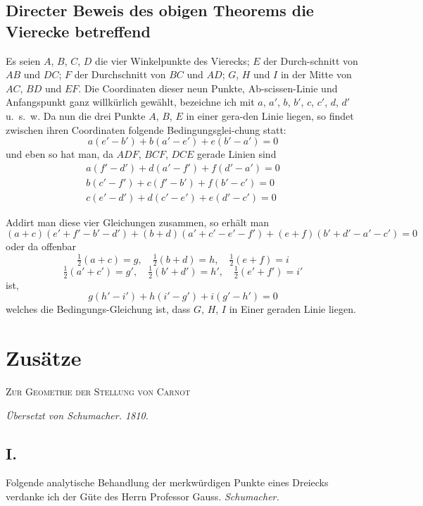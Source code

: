\documentclass[12pt,a4paper]{article}
\begin{document}
\subsection*{Directer Beweis des obigen Theorems die Vierecke betreffend}

Es seien $A$, $B$, $C$, $D$ die vier Winkelpunkte des Vierecks; $E$ der Durch-\/schnitt von $AB$ und $DC$; $F$ der Durchschnitt von $BC$ und $AD$; $G$, $H$ und $I$
in der Mitte von $AC$, $BD$ und $EF$. Die Coordinaten dieser neun Punkte, Ab-\/scissen-Linie und Anfangspunkt ganz willk\"urlich gew\"ahlt, bezeichne ich mit
$a$, $a'$, $b$, $b'$, $c$, $c'$, $d$, $d'$ u.~s.~w. Da nun die drei Punkte $A$, $B$, $E$ in einer gera-\/den Linie liegen, so findet zwischen ihren Coordinaten folgende Bedingungsglei-\/chung statt:
\[
a(e'-b') + b(a'-e') + e(b'-a') = 0
\]
und eben so hat man, da $ADF$, $BCF$, $DCE$ gerade Linien sind
\begin{gather*}
a(f'-d') + d(a'-f') + f(d'-a') = 0 \\
b(c'-f') + c(f'-b') + f(b'-c') = 0 \\
c(e'-d') + d(c'-e') + e(d'-c') = 0
\end{gather*}

Addirt man diese vier Gleichungen zusammen, so erh\"alt man
\[
(a+c)(e'+f'-b'-d') + (b+d)(a'+c'-e'-f') + (e+f)(b'+d'-a'-c') = 0
\]
oder da offenbar
\[
\tfrac{1}{2}(a+c)=g,\quad \tfrac{1}{2}(b+d)=h,\quad \tfrac{1}{2}(e+f)=i
\]
\[
\tfrac{1}{2}(a'+c')=g',\quad \tfrac{1}{2}(b'+d')=h',\quad \tfrac{1}{2}(e'+f')=i'
\]
ist,
\[
g(h'-i') + h(i'-g') + i(g'-h') = 0
\]
welches die Bedingungs-Gleichung ist, dass $G$, $H$, $I$ in Einer geraden Linie
liegen.

\newpage
\section*{Zus\"atze}

\begin{center}
\Large\textsc{Zur Geometrie der Stellung von Carnot}

\normalsize
\textit{\"Ubersetzt von Schumacher. 1810.}
\end{center}

\subsection*{I.}

Folgende analytische Behandlung der merkw\"urdigen Punkte eines Dreiecks
verdanke ich der G\"ute des Herrn Professor Gauss. \textit{Schumacher.}
\end{document}
